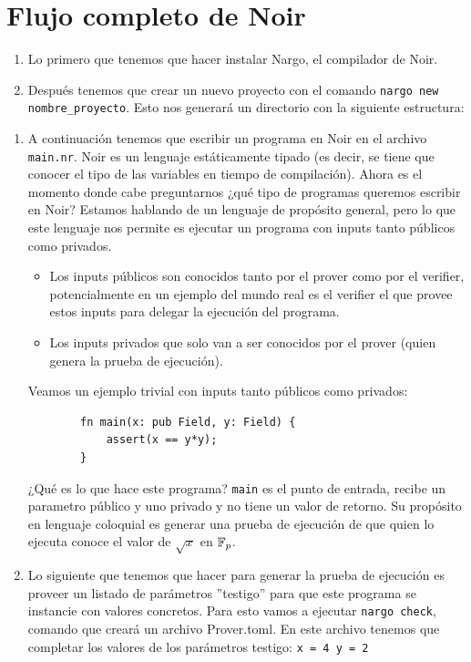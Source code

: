 \documentclass[11pt,a4paper]{tesis}
\begin{document}
\appendix
\chapter{Flujo completo de Noir}\label{sec:apendice_noir}
\begin{enumerate}
	\item Lo primero que tenemos que hacer instalar Nargo, el compilador de Noir.
	\item Después tenemos que crear un nuevo proyecto con el comando \texttt{nargo new nombre\_proyecto}. Esto nos generará un directorio con la siguiente estructura:
\end{enumerate}
\begin{enumerate}[start=3]
	\item A continuación tenemos que escribir un programa en Noir  en el archivo \texttt{main.nr}. Noir es un lenguaje estáticamente tipado (es decir, se tiene que conocer el tipo de las variables en tiempo de compilación). Ahora es el momento donde cabe preguntarnos ¿qué tipo de programas queremos escribir en Noir? Estamos hablando de un lenguaje de propósito general, pero lo que este lenguaje nos permite es ejecutar un programa con inputs tanto públicos como privados.
	\begin{itemize}
		\item Los inputs públicos son conocidos tanto por el prover como por el verifier, potencialmente en un ejemplo del mundo real es el verifier el que provee estos inputs para delegar la ejecución del programa.
		\item Los inputs privados que solo van a ser conocidos por el prover (quien genera la prueba de ejecución).
	\end{itemize}
	Veamos un ejemplo trivial con inputs tanto públicos como privados:
	\begin{verbatim}
		fn main(x: pub Field, y: Field) {
			assert(x == y*y);
		}
	\end{verbatim}
	¿Qué es lo que hace este programa? \texttt{main} es el punto de entrada, recibe un parametro público y uno privado y no tiene un valor de retorno. Su propósito en lenguaje coloquial es generar una prueba de ejecución de que quien lo ejecuta conoce el valor de $\sqrt{x}$ en $\mathbb{F}_p$. 
	
	\item Lo siguiente que tenemos que hacer para generar la prueba de ejecución es proveer un listado de parámetros ''testigo'' para que este programa se instancie con valores concretos. Para esto vamos a ejecutar \texttt{nargo check}, comando que creará un archivo Prover.toml. En este archivo tenemos que completar los valores de los parámetros testigo: \texttt{x = 4 y = 2}
	

\end{enumerate}
\end{document}
